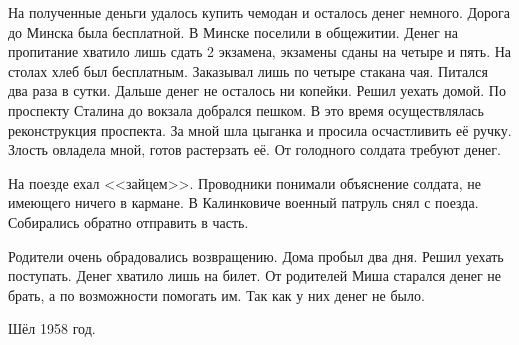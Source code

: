 На полученные деньги удалось купить чемодан и осталось денег немного. Дорога до Минска была бесплатной. В Минске поселили в общежитии. Денег на пропитание хватило лишь сдать 2 экзамена, экзамены сданы на четыре и пять. На столах хлеб был бесплатным. Заказывал лишь по четыре стакана чая. Питался два раза в сутки. Дальше денег не осталось ни копейки. Решил уехать домой. По проспекту Сталина до вокзала добрался пешком. В это время осуществлялась реконструкция проспекта. За мной шла цыганка и просила осчастливить её ручку. Злость овладела мной, готов растерзать её. От голодного солдата требуют денег.

На поезде ехал <<зайцем>>. Проводники понимали объяснение солдата, не имеющего ничего в кармане. В Калинковиче военный патруль снял с поезда. Собирались обратно отправить в часть. 

Родители очень обрадовались возвращению. Дома пробыл два дня. Решил уехать поступать. Денег хватило лишь на билет. От родителей Миша старался денег не брать, а по возможности помогать им. Так как у них денег не было.

Шёл 1958 год.